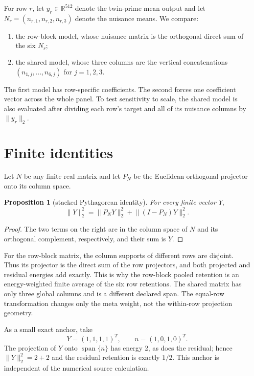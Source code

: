 \documentclass[11pt]{article}
\newtheorem{proposition}{Proposition}
\newcommand{\R}{\mathbb{R}}
\newcommand{\norm}[1]{\lVert #1\rVert_2}
\begin{document}
For row $r$, let $y_r\in\R^{512}$ denote the twin-prime mean output and let
\(N_r=(n_{r,1},n_{r,2},n_{r,3})\) denote the nuisance means.  We compare:
\begin{enumerate}
\item the row-block model, whose nuisance matrix is the orthogonal direct sum
      of the six $N_r$;
\item the shared model, whose three columns are the vertical concatenations
      $(n_{1,j},\ldots,n_{6,j})$ for $j=1,2,3$.
\end{enumerate}
The first model has row-specific coefficients.  The second forces one
coefficient vector across the whole panel.  To test sensitivity to scale, the
shared model is also evaluated after dividing each row's target and all of its
nuisance columns by $\norm{y_r}$.

\section{Finite identities}

Let $N$ be any finite real matrix and let $P_N$ be the Euclidean orthogonal
projector onto its column space.

\begin{proposition}[stacked Pythagorean identity]
For every finite vector $Y$,
\begin{equation}
 \norm{Y}^2=\norm{P_NY}^2+\norm{(I-P_N)Y}^2.
 \label{eq:stacked}
\end{equation}
\end{proposition}
\begin{proof}
The two terms on the right are in the column space of $N$ and its orthogonal
complement, respectively, and their sum is $Y$.
\end{proof}

For the row-block matrix, the column supports of different rows are disjoint.
Thus its projector is the direct sum of the row projectors, and both projected
and residual energies add exactly.  This is why the row-block pooled retention
is an energy-weighted finite average of the six row retentions.  The shared
matrix has only three global columns and is a different declared span.  The
equal-row transformation changes only the meta weight, not the within-row
projection geometry.

As a small exact anchor, take
\[
 Y=(1,1,1,1)^T,\qquad n=(1,0,1,0)^T.
\]
The projection of $Y$ onto $\operatorname{span}\{n\}$ has energy $2$, as does
the residual; hence $\norm{Y}^2=2+2$ and the residual retention is exactly
$1/2$.  This anchor is independent of the numerical source calculation.
\end{document}

